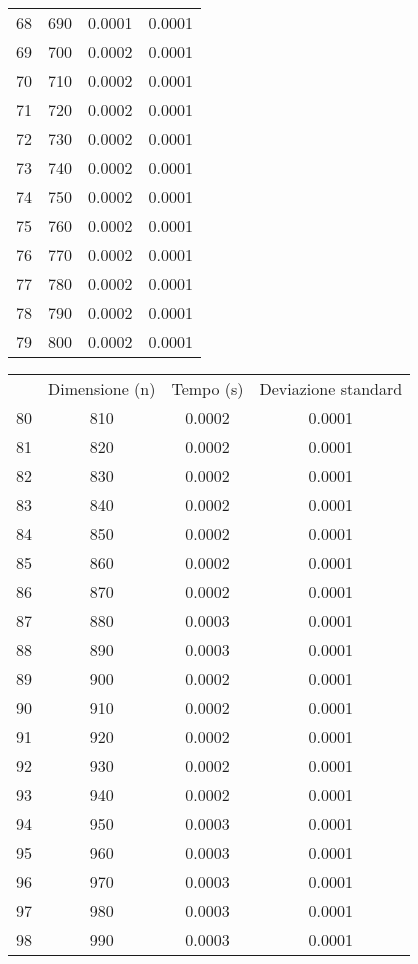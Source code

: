 \begin{table}
\begin{adjustbox}{width=1\textwidth/2}
\begin{tabular}{|c|c|c|c|}
68 & 690 & 0.0001 & 0.0001 \\
\cline{1-4}
69 & 700 & 0.0002 & 0.0001 \\
\cline{1-4}
70 & 710 & 0.0002 & 0.0001 \\
\cline{1-4}
71 & 720 & 0.0002 & 0.0001 \\
\cline{1-4}
72 & 730 & 0.0002 & 0.0001 \\
\cline{1-4}
73 & 740 & 0.0002 & 0.0001 \\
\cline{1-4}
74 & 750 & 0.0002 & 0.0001 \\
\cline{1-4}
75 & 760 & 0.0002 & 0.0001 \\
\cline{1-4}
76 & 770 & 0.0002 & 0.0001 \\
\cline{1-4}
77 & 780 & 0.0002 & 0.0001 \\
\cline{1-4}
78 & 790 & 0.0002 & 0.0001 \\
\cline{1-4}
79 & 800 & 0.0002 & 0.0001 \\
\cline{1-4}
\end{tabular}
\end{adjustbox}
\end{table}

\begin{table}
\centering
\begin{adjustbox}{width=1\textwidth/2}
\begin{tabular}{|c|c|c|c|}
\hline
 & Dimensione (n) & Tempo (s) & Deviazione standard \\
80 & 810 & 0.0002 & 0.0001 \\
\cline{1-4}
81 & 820 & 0.0002 & 0.0001 \\
\cline{1-4}
82 & 830 & 0.0002 & 0.0001 \\
\cline{1-4}
83 & 840 & 0.0002 & 0.0001 \\
\cline{1-4}
84 & 850 & 0.0002 & 0.0001 \\
\cline{1-4}
85 & 860 & 0.0002 & 0.0001 \\
\cline{1-4}
86 & 870 & 0.0002 & 0.0001 \\
\cline{1-4}
87 & 880 & 0.0003 & 0.0001 \\
\cline{1-4}
88 & 890 & 0.0003 & 0.0001 \\
\cline{1-4}
89 & 900 & 0.0002 & 0.0001 \\
\cline{1-4}
90 & 910 & 0.0002 & 0.0001 \\
\cline{1-4}
91 & 920 & 0.0002 & 0.0001 \\
\cline{1-4}
92 & 930 & 0.0002 & 0.0001 \\
\cline{1-4}
93 & 940 & 0.0002 & 0.0001 \\
\cline{1-4}
94 & 950 & 0.0003 & 0.0001 \\
\cline{1-4}
95 & 960 & 0.0003 & 0.0001 \\
\cline{1-4}
96 & 970 & 0.0003 & 0.0001 \\
\cline{1-4}
97 & 980 & 0.0003 & 0.0001 \\
\cline{1-4}
98 & 990 & 0.0003 & 0.0001 \\
\cline{1-4}
\end{tabular}
\end{adjustbox}
\end{table}

